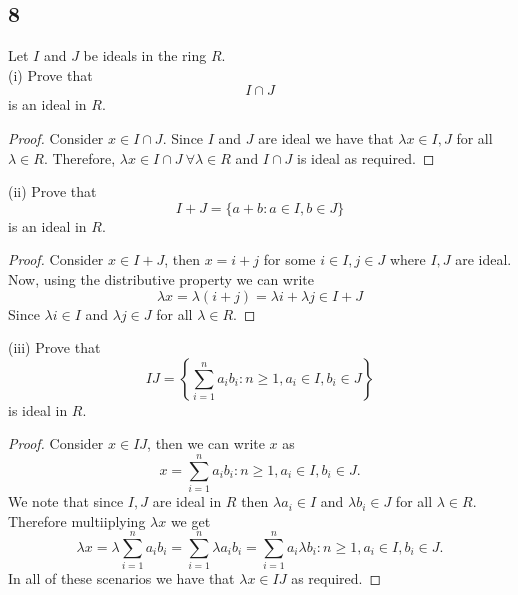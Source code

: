 \documentclass{article}
\newenvironment{hwproof}[1]
{
    #1
    \begin{proof}
}{
    \end{proof}
}
\begin{document}
\subsection*{8}
\begin{hwproof}
    {
        Let $I$ and $J$ be ideals in the ring $R$.\\
        (i) Prove that
        \begin{equation*}
            I\cap J
        \end{equation*}
        is an ideal in $R$.
    }
    Consider $x \in I \cap J$. Since $I$ and $J$ are ideal we have that
    $\lambda x \in I, J$ for all $\lambda \in R$. Therefore,
    $\lambda x \in I \cap J \ \forall \lambda \in R$ and $I \cap J$ is ideal
    as required.
\end{hwproof}

\begin{hwproof}
    {
        (ii) Prove that
        \begin{equation*}
            I + J = \{a + b : a \in I, b \in J\}
        \end{equation*}
        is an ideal in $R$.
    }
    Consider $x \in I + J$, then $x = i + j$ for some $i \in I, j \in J$ where
    $I, J$ are ideal.
    Now, using the distributive property we can write
    \[\lambda x = \lambda(i + j) = \lambda i + \lambda j \in I + J\]
    Since $\lambda i \in I$ and $\lambda j \in J$ for all $\lambda \in R$.
\end{hwproof}

\begin{hwproof}
    {
        (iii) Prove that
        \begin{equation*}
            IJ = \left\{\sum_{i=1}^n a_ib_i : n \geq 1, a_i \in I, b_i \in J\right\}
        \end{equation*}
        is ideal in $R$.
    }
    Consider $x \in IJ$, then we can write $x$ as
    \begin{equation*}
        x = \sum_{i=1}^n a_ib_i : n \geq 1, a_i \in I, b_i \in J.
    \end{equation*}
    We note that since $I, J$ are ideal in $R$ then $\lambda a_i \in I$ and
    $\lambda b_i \in J$ for all $\lambda \in R$. Therefore multiiplying $\lambda x$
    we get
    \begin{equation*}
        \lambda x = \lambda \sum_{i=1}^n a_ib_i =
        \sum_{i=1}^n \lambda a_ib_i =
        \sum_{i=1}^n a_i\lambda b_i   : n \geq 1, a_i \in I, b_i \in J.
    \end{equation*}
    In all of these scenarios we have that $\lambda x \in IJ$ as required.
\end{hwproof}
\end{document}
